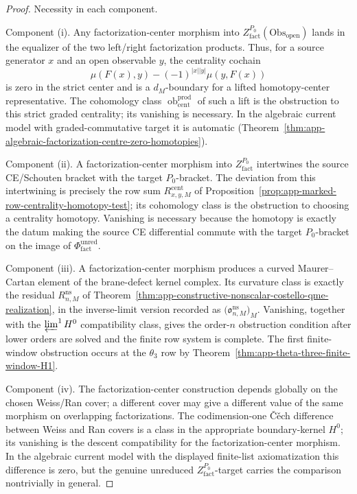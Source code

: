 \begin{proof}
  Necessity in each component.

  Component (i).  Any factorization-center morphism into
  \(Z^{P_0}_{\mathrm{fact}}(\mathrm{Obs}_{\mathrm{open}})\) lands in
  the equalizer of the two left/right factorization products.  Thus, for
  a source generator \(x\) and an open observable \(y\), the centrality
  cochain
  \[
    \mu(F(x),y)-(-1)^{|x||y|}\mu(y,F(x))
  \]
  is zero in the strict center and is a \(d_M\)-boundary for a lifted
  homotopy-center representative.  The cohomology class
  \(\operatorname{ob}^{\mathrm{prod}}_{\mathrm{cent}}\) of such a
  lift is the obstruction to this strict graded centrality; its
  vanishing is necessary.  In the algebraic current model with
  graded-commutative target it is automatic
  (Theorem~\ref{thm:app-algebraic-factorization-centre-zero-homotopies}).

  Component (ii).  A factorization-center morphism into
  \(Z^{P_0}_{\mathrm{fact}}\) intertwines the source
  CE/Schouten bracket with the target
  \(P_0\)-bracket.  The deviation from this intertwining is precisely
  the row sum
  \(R^{\mathrm{cent}}_{x,y,M}\) of
  Proposition~\ref{prop:app-marked-row-centrality-homotopy-test}; its
  cohomology class is the obstruction to choosing a centrality
  homotopy.  Vanishing is necessary because the homotopy is exactly the
  datum making the source CE differential commute with the target
  \(P_0\)-bracket on the image of
  \(\Phi_{\mathrm{fact}}^{\mathrm{unred}}\).

  Component (iii).  A factorization-center morphism produces a
  curved Maurer--Cartan element of the brane-defect kernel complex.
  Its curvature class is exactly the residual
  \(R^{\mathrm{ns}}_{n,M}\) of
  Theorem~\ref{thm:app-constructive-nonscalar-costello-qme-realization},
  in the inverse-limit version recorded as
  \(\bigl(\mathfrak o^{\mathrm{ns}}_{n,M}\bigr)_M\).  Vanishing,
	  together with the \(\varprojlim^1H^0\) compatibility class, gives
	  the order-\(n\) obstruction condition after lower orders are solved
	  and the finite row system is complete.  The first finite-window obstruction occurs at the \(\theta_3\)
  row by Theorem~\ref{thm:app-theta-three-finite-window-H1}.

  Component (iv).  The factorization-center construction depends
  globally on the chosen Weiss/Ran cover; a different cover may give
  a different value of the same morphism on overlapping
  factorizations.  The codimension-one Č\v{e}ch difference between
  Weiss and Ran covers is a class in the appropriate boundary-kernel
  \(H^0\); its vanishing is the descent compatibility for the
  factorization-center morphism.  In the algebraic current model
  with the displayed finite-list axiomatization this difference is
  zero, but the genuine unreduced
  \(Z^{P_0}_{\mathrm{fact}}\)-target carries the comparison
  nontrivially in general.


\end{proof}
